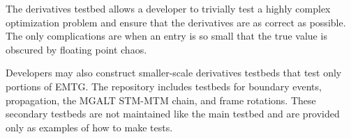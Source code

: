 The derivatives testbed allows a developer to trivially test a highly complex optimization problem and ensure that the derivatives are as correct as possible. The only complications are when an entry is so small that the true value is obscured by floating point chaos.

Developers may also construct smaller-scale derivatives testbeds that test only portions of \ac{EMTG}. The repository includes testbeds for boundary events, propagation, the \ac{MGALT} \ac{STM}-\ac{MTM} chain, and frame rotations. These secondary testbeds are not maintained like the main testbed and are provided only as examples of how to make tests.